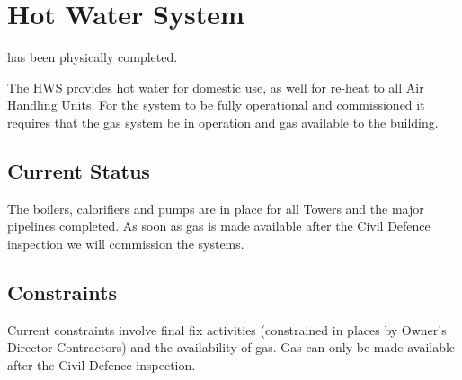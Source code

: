 \chapter{Hot Water System  }


 has been physically completed.

The HWS provides hot water for domestic use, as well for re-heat to all Air Handling Units. For the system to be fully operational and commissioned it requires that the gas system  be in operation and gas available to the building. 
%
%
% 

\section{Current Status}

The boilers, calorifiers and pumps are in place for all Towers and the major pipelines completed.  As soon as gas is made available after the Civil Defence inspection we will commission the systems.

\section{Constraints}

Current constraints involve final fix activities (constrained in places by Owner's Director Contractors) and the availability of gas. Gas can only be made available after the Civil Defence inspection.

